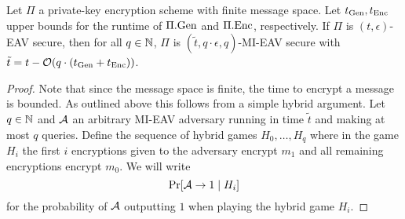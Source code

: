 \begin{lemma}
	Let $\Pi$ a private-key encryption scheme with finite message space. Let $t_{\mathrm{Gen}}, t_{\mathrm{Enc}}$ upper bounds for the runtime of $\Pi.\mathrm{Gen}$ and $\Pi.\mathrm{Enc}$, respectively. If $\Pi$ is $(t, \epsilon)$-EAV secure, then for all $q \in \mathbb{N}$, $\Pi$ is $(\tilde{t}, q \cdot \epsilon, q)$-MI-EAV secure with $\tilde{t} = t - \mathcal{O}(q \cdot (t_{\mathrm{Gen}} + t_{\mathrm{Enc}}))$.
\end{lemma}
\begin{proof} Note that since the message space is finite, the time to encrypt a message is bounded. As outlined above this follows from a simple hybrid argument. Let $q \in \mathbb{N}$ and $\mathcal{A}$ an arbitrary MI-EAV adversary running in time $\tilde{t}$ and making at most $q$ queries. Define the sequence of hybrid games $H_0, \ldots, H_q$ where in the game $H_i$ the first $i$ encryptions given to the adversary encrypt $m_1$ and all remaining encryptions encrypt $m_0$. We will write
	\[
		\pr{\adv \rightarrow 1 \mid H_i}
	\]
	for the probability of $\mathcal{A}$ outputting $1$ when playing the hybrid game $H_i$.


\end{proof}
